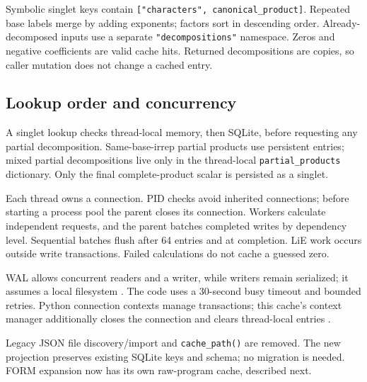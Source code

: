\documentclass[11pt,a4paper]{article}
\newcommand{\code}[1]{{\small\nolinkurl{#1}}}
\begin{document}
Symbolic singlet keys contain \code{["characters", canonical_product]}.
Repeated base labels merge by adding exponents; factors sort in descending order.
Already-decomposed inputs use a separate \code{"decompositions"} namespace.
Zeros and negative coefficients are valid cache hits. Returned decompositions
are copies, so caller mutation does not change a cached entry.

\subsection{Lookup order and concurrency}
A singlet lookup checks thread-local memory, then SQLite, before requesting any
partial decomposition. Same-base-irrep partial products use persistent entries;
mixed partial decompositions live only in the thread-local \code{partial_products}
dictionary. Only the final complete-product scalar is persisted as a singlet.

Each thread owns a connection. PID checks avoid inherited connections; before
starting a process pool the parent closes its connection. Workers calculate
independent requests, and the parent batches completed writes by dependency
level. Sequential batches flush after 64 entries and at completion. LiE work
occurs outside write transactions. Failed calculations do not cache a guessed zero.

WAL allows concurrent readers and a writer, while writers remain serialized;
it assumes a local filesystem \cite{sqlite-wal}. The code uses a 30-second busy
timeout and bounded retries. Python connection contexts manage transactions;
this cache's context manager additionally closes the connection and clears
thread-local entries \cite{python-sqlite}.

Legacy JSON file discovery/import and \code{cache_path()} are removed. The new
projection preserves existing SQLite keys and schema; no migration is needed.
FORM expansion now has its own raw-program cache, described next.
\newcommand{\cacheheading}{\subsection}


\clearpage
\end{document}
